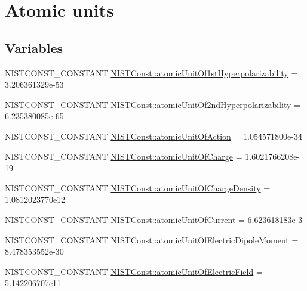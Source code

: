 \hypertarget{group___n_i_s_t_const-_atomic_unit}{}\section{Atomic units}
\label{group___n_i_s_t_const-_atomic_unit}
\subsection*{Variables}
\begin{DoxyCompactItemize}
\item 
N\+I\+S\+T\+C\+O\+N\+S\+T\+\_\+\+C\+O\+N\+S\+T\+A\+NT \mbox{\hyperlink{group___n_i_s_t_const-_atomic_unit_gaa8a2a7516740737167afdeb3cd4ee584}{N\+I\+S\+T\+Const\+::atomic\+Unit\+Of1st\+Hyperpolarizability}} = 3.\+206361329e-\/53
\item 
N\+I\+S\+T\+C\+O\+N\+S\+T\+\_\+\+C\+O\+N\+S\+T\+A\+NT \mbox{\hyperlink{group___n_i_s_t_const-_atomic_unit_gabcc03469254baef16a69abd058ae5ada}{N\+I\+S\+T\+Const\+::atomic\+Unit\+Of2nd\+Hyperpolarizability}} = 6.\+235380085e-\/65
\item 
N\+I\+S\+T\+C\+O\+N\+S\+T\+\_\+\+C\+O\+N\+S\+T\+A\+NT \mbox{\hyperlink{group___n_i_s_t_const-_atomic_unit_ga7f1326edcbb03c0df4c2e81afcea7ac8}{N\+I\+S\+T\+Const\+::atomic\+Unit\+Of\+Action}} = 1.\+054571800e-\/34
\item 
N\+I\+S\+T\+C\+O\+N\+S\+T\+\_\+\+C\+O\+N\+S\+T\+A\+NT \mbox{\hyperlink{group___n_i_s_t_const-_atomic_unit_gaa850ac93fa2ec31582147af4bcafd984}{N\+I\+S\+T\+Const\+::atomic\+Unit\+Of\+Charge}} = 1.\+6021766208e-\/19
\item 
N\+I\+S\+T\+C\+O\+N\+S\+T\+\_\+\+C\+O\+N\+S\+T\+A\+NT \mbox{\hyperlink{group___n_i_s_t_const-_atomic_unit_gaaeb55a2b43e7885495495e2a613eb481}{N\+I\+S\+T\+Const\+::atomic\+Unit\+Of\+Charge\+Density}} = 1.\+0812023770e12
\item 
N\+I\+S\+T\+C\+O\+N\+S\+T\+\_\+\+C\+O\+N\+S\+T\+A\+NT \mbox{\hyperlink{group___n_i_s_t_const-_atomic_unit_ga664164b535c0f978a02afff805d58a34}{N\+I\+S\+T\+Const\+::atomic\+Unit\+Of\+Current}} = 6.\+623618183e-\/3
\item 
N\+I\+S\+T\+C\+O\+N\+S\+T\+\_\+\+C\+O\+N\+S\+T\+A\+NT \mbox{\hyperlink{group___n_i_s_t_const-_atomic_unit_ga9d0aa0f462c3cbf3000181f1f4dc2e97}{N\+I\+S\+T\+Const\+::atomic\+Unit\+Of\+Electric\+Dipole\+Moment}} = 8.\+478353552e-\/30
\item 
N\+I\+S\+T\+C\+O\+N\+S\+T\+\_\+\+C\+O\+N\+S\+T\+A\+NT \mbox{\hyperlink{group___n_i_s_t_const-_atomic_unit_ga5d6c6686a6a6ea451d3cb975878f623a}{N\+I\+S\+T\+Const\+::atomic\+Unit\+Of\+Electric\+Field}} = 5.\+142206707e11

\end{DoxyCompactItemize}

